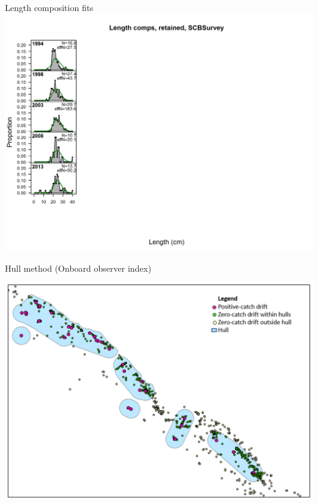 \documentclass[ignorenonframetext,]{beamer}
\begin{document}
\begin{frame}{Length composition fits}\includegraphics{./r4ss/plots_mod1/comp_lenfit_flt11mkt2.png}\end{frame}

\begin{frame}{Hull method (Onboard observer index)}

\includegraphics{Figures/hull_method.png}

\end{frame}
\end{document}
